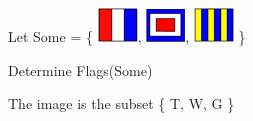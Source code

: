 \documentclass{ximera}
\begin{document}
\begin{exercise}
Let  Some = \{ {\includegraphics[width=40px,height=34px]{pics/flags/T.png}}, {\includegraphics[width=39px,height=33px]{pics/flags/W.png}}, {\includegraphics[width=40px,height=34px]{pics/flags/G.png}} \}

Determine Flags(Some)

  \begin{selectAll}
  \end{selectAll}
  \begin{feedback}
The image is the subset \{ T, W, G \}
  \end{feedback}
\end{exercise}
\end{document}
